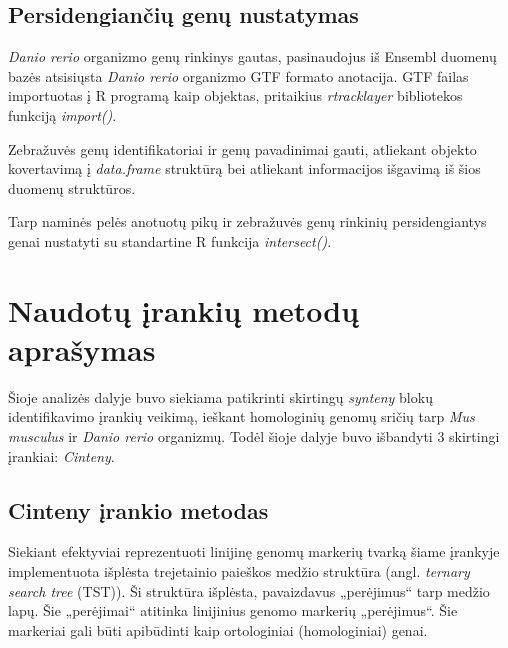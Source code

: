 \documentclass[12pt]{article}
\begin{document}
\subsection{Persidengiančių genų nustatymas}
\emph{Danio rerio} organizmo genų rinkinys gautas, pasinaudojus iš
Ensembl\cite{ENSEMBL} duomenų bazės atsisiųsta \emph{Danio rerio}
organizmo GTF formato anotacija. GTF failas importuotas į R programą
kaip objektas, pritaikius \emph{rtracklayer}\cite{R_TRACK} bibliotekos funkciją
\emph{import()}.

Zebražuvės genų identifikatoriai ir genų pavadinimai gauti, atliekant objekto
kovertavimą į \emph{data.frame} struktūrą bei atliekant informacijos išgavimą
iš šios duomenų struktūros.

Tarp naminės pelės anotuotų pikų ir zebražuvės genų rinkinių persidengiantys
genai nustatyti su standartine R funkcija \emph{intersect()}.

\newpage


\section{Naudotų įrankių metodų aprašymas}
Šioje analizės dalyje buvo siekiama patikrinti skirtingų \emph{synteny} blokų
identifikavimo įrankių veikimą, ieškant homologinių genomų sričių tarp
\emph{Mus musculus} ir \emph{Danio rerio} organizmų. Todėl šioje dalyje buvo
išbandyti 3 skirtingi įrankiai: \emph{Cinteny}.

\subsection{\textbf{Cinteny} įrankio metodas}

Siekiant efektyviai reprezentuoti linijinę genomų markerių tvarką šiame įrankyje
implementuota išplėsta trejetainio paieškos medžio struktūra (angl.
\emph{ternary search tree} (TST)). Ši struktūra išplėsta, pavaizdavus
„perėjimus“ tarp medžio lapų. Šie „perėjimai“ atitinka linijinius genomo
markerių „perėjimus“. Šie markeriai gali būti apibūdinti kaip ortologiniai
(homologiniai) genai.
\end{document}
